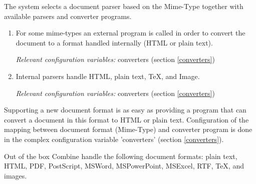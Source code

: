 The system selects a document parser based on the Mime-Type together
with available parsers and converter programs.
\begin{enumerate}
\item For some mime-types an external program
is called in order to convert the document to a format handled internally (HTML or plain text).

{\em Relevant configuration variables:} converters (section \ref{converters})

\item Internal parsers handle HTML, plain text, TeX, and Image.

{\em Relevant configuration variables:} converters (section \ref{converters})

\end{enumerate}

Supporting a new document format is as easy as providing a program
that can convert a document in this format to HTML or plain text.
Configuration of the mapping between document format (Mime-Type) and converter program is done in the complex configuration variable 'converters' (section  \ref{converters}). 

Out of the box Combine handle the following document formats: plain text, HTML,
PDF, PostScript, MSWord, MSPowerPoint, MSExcel, RTF, TeX, and images.

%

